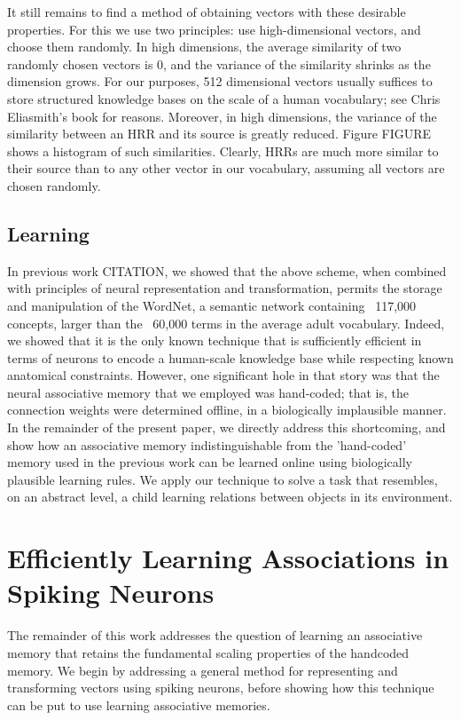 \documentclass[10pt,letterpaper]{article}
\begin{document}
It still remains to find a method of obtaining vectors with these desirable properties. For this we use two principles: use high-dimensional vectors, and choose them randomly. In high dimensions, the average similarity of two randomly chosen vectors is 0, and the variance of the similarity shrinks as the dimension grows. For our purposes, 512 dimensional vectors usually suffices to store structured knowledge bases on the scale of a human vocabulary; see Chris Eliasmith's book for reasons.
Moreover, in high dimensions, the variance of the similarity between an HRR and its source is greatly reduced. Figure FIGURE shows a histogram of such similarities. Clearly, HRRs are much more similar to their source than to any other vector in our vocabulary, assuming all vectors are chosen randomly.

\subsection{Learning}
In previous work CITATION, we showed that the above scheme, when combined with principles of neural representation and transformation, permits the storage and manipulation of the WordNet, a semantic network containing ~117,000 concepts, larger than the ~60,000 terms in the average adult vocabulary. Indeed, we showed that it is the only known technique that is sufficiently efficient in terms of neurons to encode a human-scale knowledge base while respecting known anatomical constraints. However, one significant hole in that story was that the neural associative memory that we employed was hand-coded; that is, the connection weights were determined offline, in a biologically implausible manner. In the remainder of the present paper, we directly address this shortcoming, and show how an associative memory indistinguishable from the 'hand-coded' memory used in the previous work can be learned online using biologically plausible learning rules. We apply our technique to solve a task that resembles, on an abstract level, a child learning relations between objects in its environment.

\section{Efficiently Learning Associations in Spiking Neurons}
The remainder of this work addresses the question of learning an associative memory that retains the fundamental scaling properties of the handcoded memory. We begin by addressing a general method for representing and transforming vectors using spiking neurons, before showing how this technique can be put to use learning associative memories.
\end{document}
